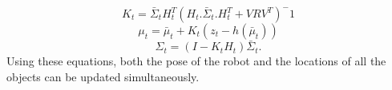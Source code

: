  		\begin{equation}
 		K_{t}=\bar{\Sigma}_{t}H_{t}^{T}(H_{t}.\bar{\Sigma}_{t}.H_{t}^{T}+VRV^{T})^-1
 		\end{equation}
 		\begin{equation}
 		\mu_{t}=\bar{\mu}_t+K_t(z_t-h(\bar{\mu}_t))
 		\end{equation}
 		\begin{equation}
 		\Sigma_t=(I-K_tH_t)\bar{\Sigma}_t.
 		\end{equation}
Using these equations, both the pose of the robot and the locations of all the objects can be updated simultaneously.